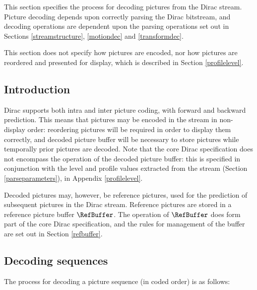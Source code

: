 
\label{picturedec}

This section specifies the process for decoding pictures from the Dirac stream. Picture decoding depends upon
correctly parsing the Dirac bitstream, and decoding operations are dependent upon the parsing operations
set out in Sections \ref{streamstructure}, \ref{motiondec} and \ref{transformdec}.

This section does not specify how pictures are encoded, nor how pictures are reordered and presented for 
display, which is described in Section \ref{profilelevel}. 

\subsection{Introduction}

Dirac supports both intra and inter picture coding, with forward and backward prediction. This means that
pictures may be encoded in the stream in non-display order: reordering pictures will be required in order
to display them correctly, and  decoded picture buffer will be necessary to store pictures while temporally 
prior pictures are decoded. Note that the core Dirac specification does not encompass the operation of the
decoded picture buffer: this is specified in conjunction with the level and profile values extracted from
the stream (Section \ref{parseparameters}), in Appendix \ref{profilelevel}. 

Decoded pictures may, however, be reference pictures, used for the prediction of subsequent pictures
in the Dirac stream. Reference pictures are stored in a reference picture buffer $\RefBuffer$. The operation
of $\RefBuffer$ does form part of the core Dirac specification, and the rules for management of the
buffer are set out in Section \ref{refbuffer}.

\subsection{Decoding sequences}
\label{sequencedecoding}

The process for decoding a picture sequence (in coded order) is as follows:

